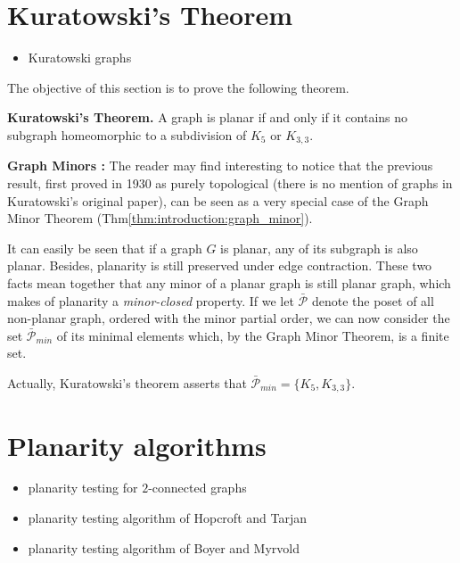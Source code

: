
\section{Kuratowski's Theorem}

\begin{itemize}
\item Kuratowski graphs
\end{itemize}

The objective of this section is to prove the following theorem.

\begin{theorem}\cite{kuratowski1930}
\label{thm:kuratowski}
{\bf Kuratowski's Theorem.}
A graph is planar if and only if it contains no subgraph homeomorphic
to a subdivision of $K_5$ or $K_{3,3}$.
\end{theorem}

{\bf Graph Minors :} The reader may find interesting to notice that the previous result, first proved in 1930 as purely topological (there is no mention of graphs in Kuratowski's original paper), can be seen as a very special case of the Graph Minor Theorem (Thm\ref{thm:introduction:graph_minor}).

It can easily be seen that if a graph $G$ is planar, any of its subgraph is also planar. Besides, planarity is still preserved under edge contraction. These two facts mean together that any minor of a planar graph is still planar graph, which makes of planarity a {\it minor-closed} property. If we let $\bar{\mathcal P}$ denote the poset of all non-planar graph, ordered with the minor partial order, we can now consider the set $\bar{\mathcal P}_{min}$ of its minimal elements which, by the Graph Minor Theorem, is a finite set.

Actually, Kuratowski's theorem asserts that $\bar{\mathcal P}_{min}=\{K_5,K_{3,3}\}$.



\section{Planarity algorithms}

\begin{itemize}
\item planarity testing for $2$-connected graphs

\item planarity testing algorithm of Hopcroft and
  Tarjan~\cite{HopcroftTarjan1974}

\item planarity testing algorithm of Boyer and
  Myrvold~\cite{BoyerMyrvold2004}
\end{itemize}
